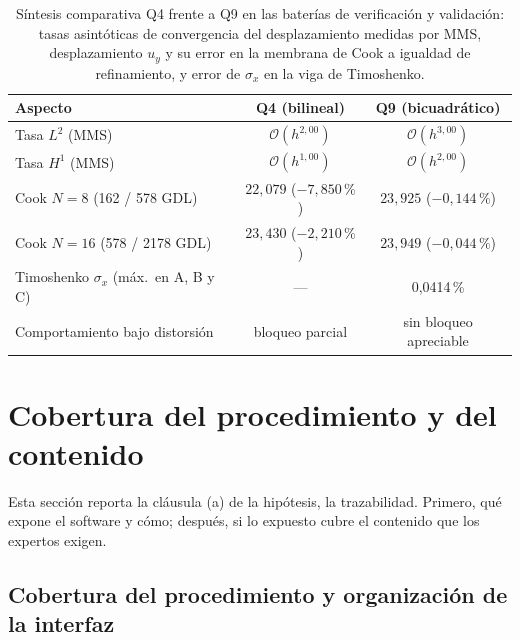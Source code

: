 \begin{table}[htbp]
\centering
\caption[Síntesis comparativa Q4 frente a Q9 en las baterías de verificación y validación.]{Síntesis comparativa Q4 frente a Q9 en las baterías de verificación y validación: tasas asintóticas de convergencia del desplazamiento medidas por MMS, desplazamiento $u_y$ y su error en la membrana de Cook a igualdad de refinamiento, y error de $\sigma_x$ en la viga de Timoshenko.}
\label{tab:resumen-q4q9}
\begin{tabular}{l c c}
\hline
Aspecto & Q4 (bilineal) & Q9 (bicuadrático) \\
\hline
Tasa $L^2$ (MMS)              & $\mathcal{O}(h^{2{,}00})$ & $\mathcal{O}(h^{3{,}00})$ \\
Tasa $H^1$ (MMS)              & $\mathcal{O}(h^{1{,}00})$ & $\mathcal{O}(h^{2{,}00})$ \\
Cook $N=8$ (162 / 578 GDL)    & $22{,}079$ ($-7{,}850\,\%$) & $23{,}925$ ($-0{,}144\,\%$) \\
Cook $N=16$ (578 / 2178 GDL)  & $23{,}430$ ($-2{,}210\,\%$) & $23{,}949$ ($-0{,}044\,\%$) \\
Timoshenko $\sigma_x$ (máx.\ en A, B y C) & --- & 0,0414\,\% \\
Comportamiento bajo distorsión & bloqueo parcial & sin bloqueo apreciable \\
\hline
\end{tabular}
{\singlespacing{}}
\end{table}

\section{Cobertura del procedimiento y del contenido}
\label{sec:cobertura}

Esta sección reporta la cláusula (a) de la hipótesis, la trazabilidad. Primero, qué expone el software y cómo; después, si lo expuesto cubre el contenido que los expertos exigen.

\subsection{Cobertura del procedimiento y organización de la interfaz}
\label{sec:cobertura-canal}

